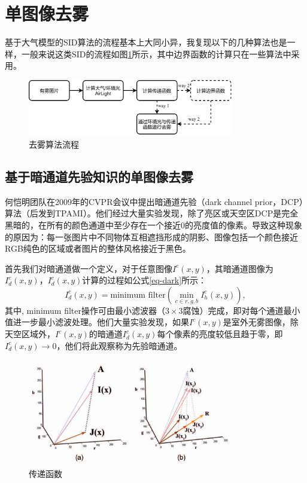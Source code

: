 \section{单图像去雾}
\label{s3}



基于大气模型的SID算法的流程基本上大同小异，我复现以下的几种算法也是一样，一般来说这类SID的流程如图\ref{fig-dehazy}所示，其中边界函数的计算只在一些算法中采用。

\begin{figure}[htbp]
    \centering
    \includegraphics[width=0.8\textwidth]{./imgs/dehazy.pdf}
    \caption{去雾算法流程}
    \label{fig-dehazy}
 \end{figure}

\subsection{基于暗通道先验知识的单图像去雾}
何恺明团队在2009年的CVPR会议中提出暗通道先验（dark channel prior，DCP）算法（后发到TPAMI\cite{he.tang201112}）。他们经过大量实验发现，除了亮区或天空区DCP是完全黑暗的，在所有的颜色通道中至少存在一个接近0的亮度值的像素。导致这种现象的原因为：每一张图片中不同物体互相遮挡形成的阴影、图像包括一个颜色接近RGB纯色的区域或者图片的整体风格接近于黑色。



首先我们对暗通道做一个定义，对于任意图像$I^c(x,y)$，其暗通道图像为$I_d^c(x,y)$，$I_d^c(x,y)$计算的过程如公式\ref{eq-dark}所示：
\begin{equation}
    I_d^c(x,y) = \text{minimum filter}(\min\limits_{c\in{r,g,b}}I_h^c(x,y)),
    \label{eq-dark}
\end{equation}
其中, minimum filter操作可由最小滤波器（$3\times3$腐蚀）完成，即对每个通道最小值进一步最小滤波处理。他们大量实验发现，如果$I^c(x,y)$是室外无雾图像，除天空区域外，$I^c(x,y)$的暗通道$I_d^c(x,y)$每个像素的亮度较低且趋于零，即$I_d^c(x,y)\rightarrow0$，他们将此观察称为先验暗通道。

\begin{figure}[htbp]
    \centering
    \includegraphics[width=0.8\textwidth]{./imgs/g711.png}
    \caption{传递函数}
    \label{fig-trans-dark}
 \end{figure}


